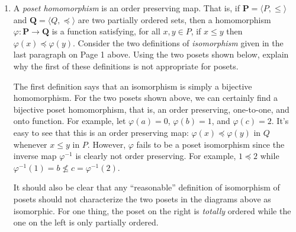 \documentclass[12pt,reqno]{amsart}
\newcommand{\bP}{\ensuremath{\mathbf{P}}}
\newcommand{\bQ}{\ensuremath{\mathbf{Q}}}
\newcommand{\<}{\ensuremath{\langle}}
\renewcommand{\>}{\ensuremath{\rangle}}
\renewcommand{\phi}{\ensuremath{\varphi}}
\begin{document}
\begin{enumerate}[{\bf 1.}]
\bigskip
\item
A \emph{poset homomorphism} is an order preserving map.  That is, if
$\bP = \<P, \leqslant\>$ and 
$\bQ = \<Q, \preccurlyeq\>$ are two partially 
ordered sets, then a homomorphism 
$\varphi: \bP \rightarrow \bQ$  is a function satisfying, for all $x, y\in P$, 
if $x \leqslant y$ then $\varphi(x)\preccurlyeq \varphi(y)$.
Consider the two definitions of \emph{isomorphism} given in the last paragraph
on Page 1 above.
Using the two posets shown below, explain why the first of these definitions is 
not appropriate for posets.

\vskip5mm

\begin{center}
\hskip3cm
\end{center}


 The first definition says that an isomorphism is
simply a bijective homomorphism.  For the two posets shown above, we can
certainly find a bijective poset homomorphism, that is, an order preserving,
one-to-one, and onto function. For example, let 
$\phi(a) = 0$, 
$\phi(b) = 1$, and 
$\phi(c) = 2$. It's easy to see that this is an order preserving map:
$\phi(x) \preccurlyeq \phi(y)$ in $Q$ whenever 
$x\leq y$ in $P$.  However, $\phi$ fails to be a poset isomorphism since
the inverse map $\phi^{-1}$ is clearly not order preserving.  
For example, $1\preccurlyeq 2$ while $\phi^{-1}(1) = b  \nleq c = \phi^{-1}(2)$.

It should also be clear that any ``reasonable''
definition of isomorphism of posets should not characterize the two posets in the
diagrams above as isomorphic.  For one thing, the poset on the right is \emph{totally}
ordered while the one on the left is only partially ordered.
\vskip1cm


\end{enumerate}
\end{document}
